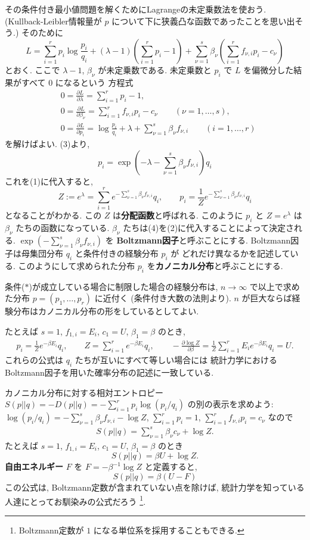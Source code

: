 \documentclass[12pt,twoside]{jarticle}
\renewcommand\d{\partial}
\theoremstyle{jplain}
\theoremstyle{jplain}
\theoremstyle{jplain}
\numberwithin{theorem}{section}
\numberwithin{equation}{section}
\numberwithin{figure}{section}
\numberwithin{table}{section}
\begin{document}
その条件付き最小値問題を解くためにLagrangeの未定乗数法を使おう.
(Kullback-Leibler情報量が $p$ について下に狭義凸な函数であったことを思い出そう.)
そのために
\[
L 
= \sum_{i=1}^r p_i \log\frac{p_i}{q_i} 
+ (\lambda-1)\left(\sum_{i=1}^r p_i-1\right)
+ \sum_{\nu=1}^s\beta_\nu\left(\sum_{i=1}^r f_{\nu,i}p_i - c_\nu \right)
\]
とおく. ここで $\lambda-1$, $\beta_\nu$ が未定乗数である.
未定乗数と $p_i$ で $L$ を偏微分した結果がすべて $0$ になるという
方程式
\begin{align*}
&
0=\frac{\d L}{\d\lambda} = \sum_{i=1}^r p_i - 1,
\tag{1}
\\ &
0=\frac{\d L}{\d\beta_\nu} = \sum_{i=1}^r f_{\nu,i}p_i - c_\nu
\qquad (\nu=1,\ldots,s),
\tag{2}
\\ &
0=\frac{\d L}{\d p_i} = \log\frac{p_i}{q_i} + \lambda + \sum_{\nu=1}^s \beta_\nu f_{\nu,i}
\qquad (i=1,\ldots,r)
\tag{3} 
\end{align*}
を解けばよい. (3)より,
\[
p_i = \exp\left(-\lambda-\sum_{\nu=1}^s \beta_\nu f_{\nu,i} \right)q_i
\]
これを(1)に代入すると,
\[
Z:= e^\lambda 
= \sum_{i=1}^r e^{-\sum_{\nu=1}^s \beta_\nu f_{\nu,i}}q_i,
\qquad
p_i = \frac{1}{Z}e^{-\sum_{\nu=1}^s \beta_\nu f_{\nu,i}}q_i
\tag{4}
\]
となることがわかる. この $Z$ は{\bf 分配函数}と呼ばれる.
このように $p_i$ と $Z=e^\lambda$ は $\beta_\nu$ たちの函数になっている. 
$\beta_\nu$ たちは(4)を(2)に代入することによって決定される.
$\exp\left(-\sum_{\nu=1}^s \beta_\nu f_{\nu,i}\right)$ を
{\bf Boltzmann因子}と呼ぶことにする.
Boltzmann因子は母集団分布 $q_i$ と条件付きの経験分布 $p_i$ が
どれだけ異なるかを記述している.
このようにして求められた分布 $p_i$ を{\bf カノニカル分布}と呼ぶことにする.

条件($*$)が成立している場合に制限した場合の経験分布は,
$n\to\infty$ で以上で求めた分布 $p=(p_1,\ldots,p_r)$ に近付く
(条件付き大数の法則より). 
$n$ が巨大ならば経験分布はカノニカル分布の形をしているとしてよい.

たとえば $s=1$, $f_{1,i}=E_i$, $c_1=U$, $\beta_1=\beta$ のとき, 
\begin{align*}
p_i = \frac{1}{Z}e^{-\beta E_i}q_i,
\qquad
Z = \sum_{i=1}^r e^{-\beta E_i}q_i,
\qquad
-\frac{\d\log Z}{\d\beta} 
= \frac{1}{Z} \sum_{i=1}^r E_i e^{-\beta E_i}q_i = U.
\end{align*}
これらの公式は $q_i$ たちが互いにすべて等しい場合には
統計力学におけるBoltzmann因子を用いた確率分布の記述に一致している.

カノニカル分布に対する相対エントロピー $S(p||q)=-D(p||q)=-\sum_{i=1}^r p_i\log(p_i/q_i)$
の別の表示を求めよう: 
$\log(p_i/q_i)=-\sum_{\nu=1}^s\beta_\nu f_{\nu,i}-\log Z$, $\sum_{i=1}^r p_i=1$,
$\sum_{i=1}^r f_{\nu,i}p_i=c_\nu$ なので
\begin{align*}
S(p||q) = \sum_{\nu=1}^s \beta_\nu c_\nu + \log Z.
\end{align*}
たとえば $s=1$, $f_{1,i}=E_i$, $c_1=U$, $\beta_1=\beta$ のとき
\[
S(p||q) = \beta U + \log Z.
\]
{\bf 自由エネルギー} $F$ を $F=-\beta^{-1}\log Z$ と定義すると,
\[
S(p||q) = \beta(U-F)
\]
この公式は, Boltzmann定数が含まれていない点を除けば,
統計力学を知っている人達にとってお馴染みの公式だろう%
\footnote{Boltzmann定数が $1$ になる単位系を採用することもできる.}.
\end{document}
